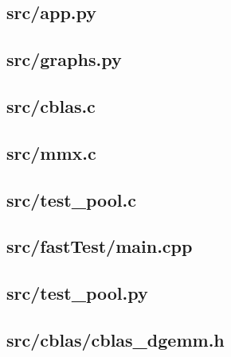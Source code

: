 \subsection{src/app.py}
	
	\newpage

\subsection{src/graphs.py}
	
	\newpage

\subsection{src/cblas.c}
	
	\newpage

\subsection{src/mmx.c}

\newpage

\subsection{src/test\_pool.c}

\newpage

\subsection{src/fastTest/main.cpp}

\newpage

\subsection{src/test\_pool.py}

\newpage

\subsection{src/cblas/cblas\_dgemm.h}
	
	\newpage

